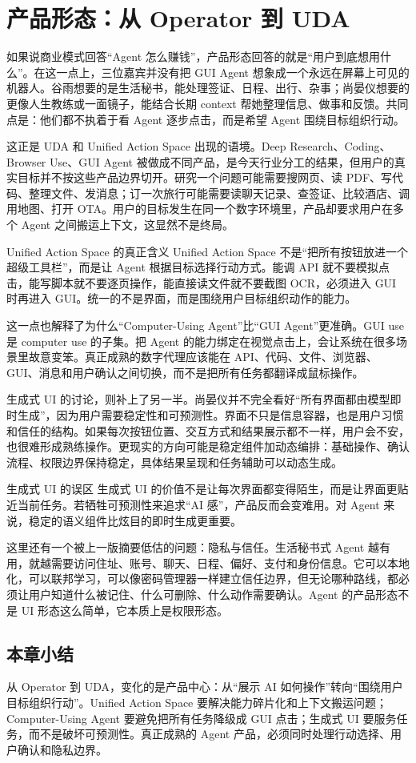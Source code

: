 \section{产品形态：从 Operator 到 UDA}

如果说商业模式回答“Agent 怎么赚钱”，产品形态回答的就是“用户到底想用什么”。在这一点上，三位嘉宾并没有把 GUI Agent 想象成一个永远在屏幕上可见的机器人。谷雨想要的是生活秘书，能处理签证、日程、出行、杂事；尚晏仪想要的更像人生教练或一面镜子，能结合长期 context 帮她整理信息、做事和反馈。共同点是：他们都不执着于看 Agent 逐步点击，而是希望 Agent 围绕目标组织行动。

这正是 UDA 和 Unified Action Space 出现的语境。Deep Research、Coding、Browser Use、GUI Agent 被做成不同产品，是今天行业分工的结果，但用户的真实目标并不按这些产品边界切开。研究一个问题可能需要搜网页、读 PDF、写代码、整理文件、发消息；订一次旅行可能需要读聊天记录、查签证、比较酒店、调用地图、打开 OTA。用户的目标发生在同一个数字环境里，产品却要求用户在多个 Agent 之间搬运上下文，这显然不是终局。

\begin{importantbox}{Unified Action Space 的真正含义}
Unified Action Space 不是“把所有按钮放进一个超级工具栏”，而是让 Agent 根据目标选择行动方式。能调 API 就不要模拟点击，能写脚本就不要逐页操作，能直接读文件就不要截图 OCR，必须进入 GUI 时再进入 GUI。统一的不是界面，而是围绕用户目标组织动作的能力。
\end{importantbox}

这一点也解释了为什么“Computer-Using Agent”比“GUI Agent”更准确。GUI use 是 computer use 的子集。把 Agent 的能力绑定在视觉点击上，会让系统在很多场景里故意变笨。真正成熟的数字代理应该能在 API、代码、文件、浏览器、GUI、消息和用户确认之间切换，而不是把所有任务都翻译成鼠标操作。

生成式 UI 的讨论，则补上了另一半。尚晏仪并不完全看好“所有界面都由模型即时生成”，因为用户需要稳定性和可预测性。界面不只是信息容器，也是用户习惯和信任的结构。如果每次按钮位置、交互方式和结果展示都不一样，用户会不安，也很难形成熟练操作。更现实的方向可能是稳定组件加动态编排：基础操作、确认流程、权限边界保持稳定，具体结果呈现和任务辅助可以动态生成。

\begin{warningbox}{生成式 UI 的误区}
生成式 UI 的价值不是让每次界面都变得陌生，而是让界面更贴近当前任务。若牺牲可预测性来追求“AI 感”，产品反而会变难用。对 Agent 来说，稳定的语义组件比炫目的即时生成更重要。
\end{warningbox}

这里还有一个被上一版摘要低估的问题：隐私与信任。生活秘书式 Agent 越有用，就越需要访问住址、账号、聊天、日程、偏好、支付和身份信息。它可以本地化，可以联邦学习，可以像密码管理器一样建立信任边界，但无论哪种路线，都必须让用户知道什么被记住、什么可删除、什么动作需要确认。Agent 的产品形态不是 UI 形态这么简单，它本质上是权限形态。

\subsection{本章小结}

从 Operator 到 UDA，变化的是产品中心：从“展示 AI 如何操作”转向“围绕用户目标组织行动”。Unified Action Space 要解决能力碎片化和上下文搬运问题；Computer-Using Agent 要避免把所有任务降级成 GUI 点击；生成式 UI 要服务任务，而不是破坏可预测性。真正成熟的 Agent 产品，必须同时处理行动选择、用户确认和隐私边界。

